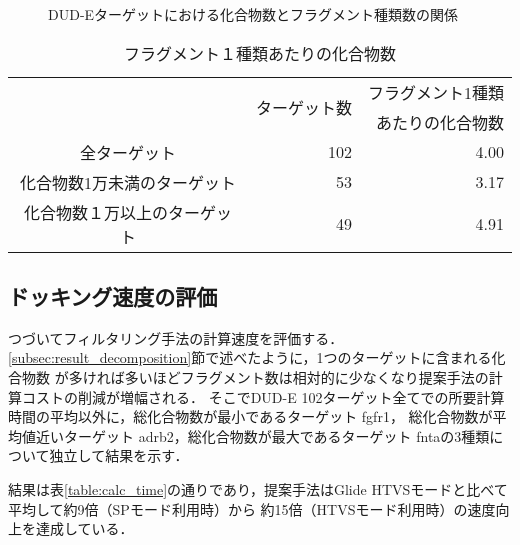 \begin{figure}[bhtp]
 \begin{center}
  \caption{DUD-Eターゲットにおける化合物数とフラグメント種類数の関係}
  \label{fig:dude_decomposition}
 \end{center}
\end{figure}
\begin{table}[htb] \centering
	\caption{フラグメント１種類あたりの化合物数}
	\label{table:dude_decomposition}
	\begin{tabular}{c|rr}
	\hline
								&\multirow{2}{*}{ターゲット数}	&フラグメント1種類		\\
								&						&あたりの化合物数		\\ \hline
	全ターゲット					&102		&4.00							\\
	化合物数1万未満のターゲット		&53			&3.17							\\
	化合物数１万以上のターゲット	&49			&4.91							\\ \hline
	\end{tabular}
\end{table}


\subsection{ドッキング速度の評価}\label{subsec:single_calc_time}
つづいてフィルタリング手法の計算速度を評価する．\ref{subsec:result_decomposition}節で述べたように，1つのターゲットに含まれる化合物数
が多ければ多いほどフラグメント数は相対的に少なくなり提案手法の計算コストの削減が増幅される．
そこでDUD-E 102ターゲット全てでの所要計算時間の平均以外に，総化合物数が最小であるターゲット fgfr1，
総化合物数が平均値近いターゲット adrb2，総化合物数が最大であるターゲット fntaの3種類について独立して結果を示す．

結果は表\ref{table:calc_time}の通りであり，提案手法はGlide HTVSモードと比べて平均して約9倍（SPモード利用時）から
約15倍（HTVSモード利用時）の速度向上を達成している．

